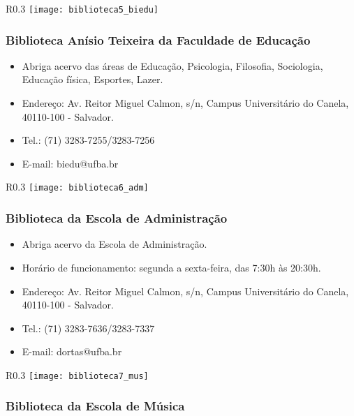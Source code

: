         \begin{wrapfigure}{R}{0.3\textwidth}
            \centering
            \texttt{[image: biblioteca5\_biedu]}
        \end{wrapfigure}
    \subsubsection{Biblioteca Anísio Teixeira da Faculdade de Educação}
        \begin{itemize}
            \item Abriga acervo das áreas de Educação, Psicologia, Filosofia, Sociologia, Educação física, Esportes, Lazer.
            \item Endereço: Av. Reitor Miguel Calmon, s/n, Campus Universitário do Canela, 40110-100 - Salvador.
            \item Tel.: (71) 3283-7255/3283-7256
            \item E-mail: biedu@ufba.br
        \end{itemize}
        \newpage
        \begin{wrapfigure}{R}{0.3\textwidth}
            \centering
            \texttt{[image: biblioteca6\_adm]}
        \end{wrapfigure}
    \subsubsection{Biblioteca da Escola de Administração}
        \begin{itemize}
            \item Abriga acervo da Escola de Administração.
            \item Horário de funcionamento: segunda a sexta-feira, das 7:30h às 20:30h.
            \item Endereço: Av. Reitor Miguel Calmon, s/n, Campus Universitário do Canela, 40110-100 - Salvador.
            \item Tel.: (71) 3283-7636/3283-7337
            \item E-mail: dortas@ufba.br
        \end{itemize}
        \begin{wrapfigure}{R}{0.3\textwidth}
            \centering
            \texttt{[image: biblioteca7\_mus]}
        \end{wrapfigure}
    \subsubsection{Biblioteca da Escola de Música}
        
